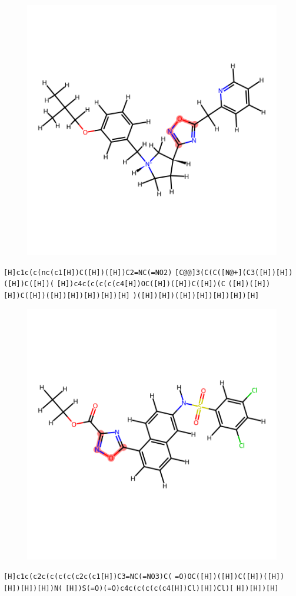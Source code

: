 \documentclass{article}
\begin{document}
\begin{figure}[ht]
\centering
    \includegraphics{mol262.png}
\end{figure}
\verb|[H]c1c(c(nc(c1[H])C([H])([H])C2=NC(=NO2)| \verb|[C@@]3(C(C([N@+](C3([H])[H])([H])C([H])(| \verb|[H])c4c(c(c(c(c4[H])OC([H])([H])C([H])(C| \verb|([H])([H])[H])C([H])([H])[H])[H])[H])[H]| \verb|)([H])[H])([H])[H])[H])[H])[H]|

\begin{figure}[ht]
\centering
    \includegraphics{mol263.png}
\end{figure}
\verb|[H]c1c(c2c(c(c(c(c2c(c1[H])C3=NC(=NO3)C(| \verb|=O)OC([H])([H])C([H])([H])[H])[H])[H])N(| \verb|[H])S(=O)(=O)c4c(c(c(c(c4[H])Cl)[H])Cl)[| \verb|H])[H])[H]|
\end{document}
